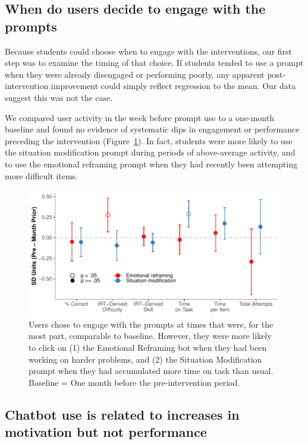 \documentclass[11pt]{report}
\begin{document}
\begin{mainf}
\subsection{When do users decide to engage with the prompts}
Because students could choose when to engage with the interventions, our first step was to examine the timing of that choice.
If students tended to use a prompt when they were already disengaged or performing poorly, any apparent post-intervention improvement could simply reflect regression to the mean.
Our data suggest this was not the case. 

We compared user activity in the week before prompt use to a one-month baseline and found no evidence of systematic dips in engagement or performance preceding the intervention (Figure~\ref{fig:when_engage}). 
In fact, students were more likely to use the situation modification prompt during periods of above-average activity, and to use the emotional reframing prompt when they had recently been attempting more difficult items.


\begin{figure}
    \centering
    \includegraphics[width=\linewidth]{when_engage.pdf}
    \caption{Users chose to engage with the prompts at times that were, for the most part, comparable to baseline. However, they were more likely to click on (1) the Emotional Reframing bot when they had been working on harder problems, and (2) the Situation Modification prompt when they had accumulated more time on task than usual. Baseline = One month before the pre-intervention period.}
    \label{fig:when_engage}
\end{figure}

\subsection{Chatbot use is related to increases in motivation but not performance}


\end{mainf}
\end{document}
